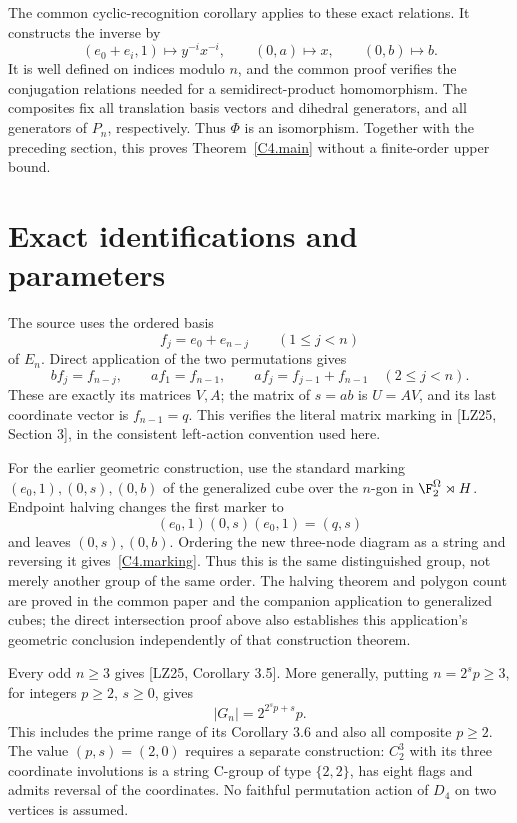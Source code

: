 The common cyclic-recognition corollary applies to these exact
relations. It constructs the inverse by
\[
 (e_0+e_i,1)\longmapsto y^{-i}x^{-i},\qquad
 (0,a)\longmapsto x,\qquad(0,b)\longmapsto b.
\]
It is well defined on indices modulo $n$, and the common proof verifies
the conjugation relations needed for a semidirect-product homomorphism.
The composites fix all translation basis vectors and dihedral
generators, and all generators of $P_n$, respectively.
Thus $\Phi$ is an isomorphism. Together with the preceding section,
this proves Theorem~\ref{C4.main} without a finite-order upper bound.

\section{Exact identifications and parameters}
The source uses the ordered basis
\[
 f_j=e_0+e_{n-j}\qquad(1\le j<n)
\]
of $E_n$. Direct application of the two permutations gives
\[
 bf_j=f_{n-j},\qquad af_1=f_{n-1},\qquad
 af_j=f_{j-1}+f_{n-1}\quad(2\le j<n).
\]
These are exactly its matrices $V,A$; the matrix of $s=ab$ is $U=AV$,
and its last coordinate vector is $f_{n-1}=q$. This verifies the literal
matrix marking in [LZ25, Section 3], in the consistent left-action
convention used here.

For the earlier geometric construction, use the standard marking
$(e_0,1),(0,s),(0,b)$ of the generalized cube over the $n$-gon in
$\F_2^\Omega\rtimes H$. Endpoint halving changes the first marker to
\[
 (e_0,1)(0,s)(e_0,1)=(q,s)
\]
and leaves $(0,s),(0,b)$. Ordering the new three-node diagram as a
string and reversing it gives~\eqref{C4.marking}. Thus this is the
same distinguished group, not merely another group of the same order.
The halving theorem and polygon count are proved in the common paper
and the companion application to generalized cubes; the direct
intersection proof above also establishes this application's geometric
conclusion independently of that construction theorem.

Every odd $n\ge3$ gives [LZ25, Corollary 3.5]. More generally,
putting $n=2^sp\ge3$, for integers $p\ge2$, $s\ge0$, gives
\[
 |G_n|=2^{2^sp+s}p.
\]
This includes the prime range of its Corollary 3.6 and also all composite
$p\ge2$. The value $(p,s)=(2,0)$ requires a separate construction:
$C_2^3$ with its three coordinate involutions is a string C-group of
type $\{2,2\}$, has eight flags and admits reversal of the coordinates.
No faithful permutation action of $D_4$ on two vertices is assumed.

